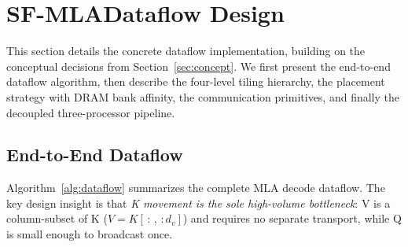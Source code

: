 \documentclass[sigconf, review, anonymous]{acmart}
\newcommand{\brand}{SF-MLA}
\begin{document}
\section{\brand Dataflow Design}\label{sec:design}

This section details the concrete dataflow implementation, building
on the conceptual decisions from Section~\ref{sec:concept}.
We first present the end-to-end dataflow algorithm, then describe
the four-level tiling hierarchy, the placement strategy with DRAM
bank affinity, the communication primitives, and finally the
decoupled three-processor pipeline.



\subsection{End-to-End Dataflow}\label{sec:design-overview}

Algorithm~\ref{alg:dataflow} summarizes the complete MLA decode
dataflow.  The key design insight is that \emph{K movement is the
sole high-volume bottleneck}: V is a column-subset of K
($V = K[\,:\,,\,:d_v]$) and requires no separate transport, while Q
is small enough to broadcast once.
\end{document}
